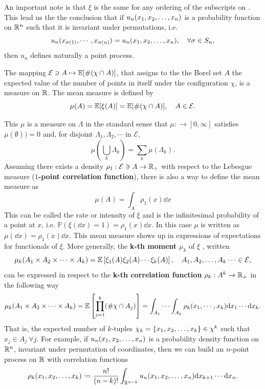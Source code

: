 An important note is that $\xi$ is the same for any ordering of the subscripts on . This lead us the the conclusion that if $u_n(x_1, x_2, \dots, x_n)$ is a probability function on $\mathbb{R}^n$ such that it is invariant under permutations, i.e.
\begin{equation}
	u_n(x_{\sigma(1)}, \cdots, x_{\sigma(n)}) = u_n(x_1, x_2, \dots, x_n), \quad \forall \sigma \in S_n,
\end{equation}
then $u_n$ defines naturally a point process.

The mapping $\mathcal{E} \ni A \mapsto \mathbb{E}[\#(\chi \cap A)]$, that assigns to the the Borel set $A$ the expected value of the number of points in itself under the configuration $\chi$, is a measure on $\mathbb{R}$. The mean measure is defined by 
\begin{equation}
	\mu(A) = \mathbb{E}[\xi(A)] = \mathbb{E}[\#(\chi \cap A)], \quad A \in \mathcal{E}.
\end{equation}

This $\mu$ is a measure on $\Lambda$ in the standard sense that $\mu : \mathcal \rightarrow [0, \infty]$ satisfies $\mu(\emptyset)) = 0$ and, for disjoint $\Lambda_1, \Lambda_2, \cdots$ in $\mathcal{E}$, 
\begin{equation}
	\mu\left( \bigcup_k \Lambda_k \right) = \sum_k \mu(\Lambda_k).
\end{equation} 
Assuming there exists a density $\rho_1: \mathcal{E} \ni A \rightarrow \mathbb{R}_+$ with respect to the Lebesgue measure (\textbf{$1$-point correlation function}), there is also a way to define the mean measure as 
\begin{equation}
	\mu(A) = \int_A \rho_1(x) \dd x
\end{equation}
This can be called the rate or intensity of $\xi$ and is the infinitesimal probability of a point at $x$, i.e. $\mathbb{P}(\xi(\dd x) = 1) = \rho_1(x) \dd x$. In this case $\mu$ is written as $\mu(\dd x) = \rho_1(x) \dd x$. This mean measure shows up in expressions of expectations for functionals of $\xi$. More generally, the \textbf{k-th moment} $\mu_k$ of $\xi$ , written
\begin{equation}
	\mu_k(A_1 \times A_2 \times \dots \times A_k) = \mathbb{E} \left[ \xi_1(A) \xi_2(A)\cdots \xi_k(A) \right], \quad A_1, A_2, \dots, A_k \cdots \in \mathcal{E},
\end{equation}
can be expressed in respect to the \textbf{k-th correlation function} $\rho_k: A^k \rightarrow \mathbb{R}_+$ in the following way
\begin{equation}
	\mu_k(A_1 \times A_2 \times \dots \times A_k) = \mathbb{E} \left[ \prod_{j=1}^{k} (\# \chi \cap A_j) \right]= \int_{A_1} \cdots \int_{A_k} \rho_k(x_1, \cdots, x_k) \mathrm{d} x_1 \cdots \mathrm{d} x_k.
	\label{Equation: kth moment measure}
\end{equation}
That is, the expected number of $k$-tuples $\chi_k = \{x_1, x_2, \dots, x_k\} \in \chi^k$ such that $x_j \in A_j\ \forall j.$ For example, if $u_n(x_1, x_2, \dots, x_n)$ is a probability density function on $\mathbb{R}^n$, invariant under permutation of coordinates, then we can build an $n$-point process on $\mathbb{R}$ with correlation functions
\begin{equation}
	\rho_k(\mmany{x}{k}) \deff \frac{n!}{(n-k)!} \int_{\R^{n-k}} u_n(\mmany{x}{n}) \dd x_{k+1} \cdots \dd x_n.
	\label{Equation: Symmetric correlation}
\end{equation}

